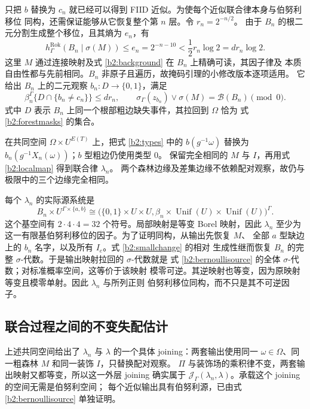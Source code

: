 \documentclass[UTF8,zihao=-4,a4paper]{ctexart}
\numberwithin{equation}{section}
\begin{document}
只把 $b$ 替换为 $c_n$ 就已经可以得到 FIID 近似。为使每个近似联合律本身与伯努利移位
同构，还需保证能够从它恢复整个第 $n$ 层。令 $r_n=2^{-n/2}$。
由于 $B_n$ 的根二元分割生成整个移位，且其熵为 $e_n$，有
\begin{equation}\label{b2:approxentropy}
 h^{\mathrm{Rok}}_\Gamma(B_n\mid\sigma(M))
 \le e_n=2^{-n-10}<\frac12r_n\log2=dr_n\log2.
\end{equation}
这里 $M$ 通过连接映射及式 \eqref{b2:background} 在 $B_n$ 上精确可读，其因子律及
本质自由性都与先前相同。$B_n$ 非原子且遍历，故掩码引理的小修改版本逐项适用。
它给出 $B_n$ 上的二元观察 $b_n:D\to\{0,1\}$，满足
\begin{equation}\label{b2:smallchange}
 \beta_n^\Gamma\{D\cap\{b_n\ne c_n\}\}\le dr_n,
 \qquad
 \sigma_\Gamma(z_{b_n})\vee\sigma(M)=\mathcal B(B_n)\pmod0.
\end{equation}
式中 $D$ 表示 $B_n$ 上同一个根部粗边缺失事件，其拉回到 $\Omega$ 恰为
式 \eqref{b2:forestmasks} 的集合。

在共同空间 $\Omega\times U^{E(T)}$ 上，把式 \eqref{b2:types} 中的
$b(g^{-1}\omega)$ 替换为 $b_n(g^{-1}X_n(\omega))$；$b$ 型粗边仍使用类型 $0$。
保留完全相同的 $M$ 与 $I$，再用式 \eqref{b2:localmap} 得到联合律 $\lambda_n$。
两个森林边缘及差集边缘不依赖配对观察，故仍与极限中的三个边缘完全相同。

每个 $\lambda_n$ 的实际源系统是
\begin{equation}\label{b2:bernoullisource}
 B_n\times U^{\Gamma\times\{a,b\}}
 \cong\bigl(\{0,1\}\times U\times U,
       \beta_n\times\operatorname{Unif}(U)\times\operatorname{Unif}(U)\bigr)^\Gamma.
\end{equation}
这个基空间有 $2\cdot4\cdot4=32$ 个符号。局部映射是等变 Borel 映射，因此
$\lambda_n$ 至少为这一有限基伯努利移位的因子。为了证明同构，从输出先恢复 $M$、
全部 $a$ 型缺边上的 $b_n$ 名字，以及所有 $I_e$。式 \eqref{b2:smallchange} 的相对
生成性继而恢复 $B_n$ 的完整 $\sigma$-代数。于是输出映射拉回的 $\sigma$-代数就是
式 \eqref{b2:bernoullisource} 的全体 $\sigma$-代数；对标准概率空间，这等价于该映射
模零可逆。其逆映射也等变，因为原映射等变且模零单射。因此 $\lambda_n$ 与所列正则
伯努利移位同构，而不只是其不可逆因子。

\subsection{联合过程之间的不变失配估计}\label{b2:convergence}

上述共同空间给出了 $\lambda_n$ 与 $\lambda$ 的一个具体 joining：两套输出使用同一
$\omega\in\Omega$、同一粗森林 $M$ 和同一装饰 $I$，只替换配对观察。
$\Pi$ 与装饰场的乘积律不变，两套输出映射又都等变，所以这一外层 joining 确实属于
$\mathcal J_\Gamma(\lambda_n,\lambda)$。承载这个 joining 的空间无需是伯努利空间；
每个近似输出具有伯努利源，已由式 \eqref{b2:bernoullisource} 单独证明。
\end{document}
